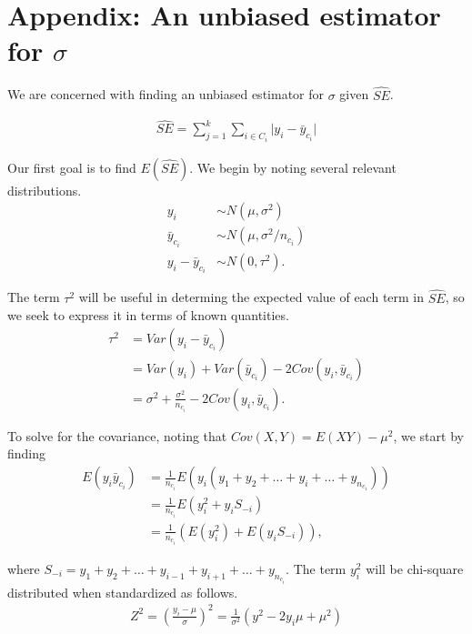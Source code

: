 \section{Appendix: An unbiased estimator for $\sigma$}
\label{Sec:AppSig}

We are concerned with finding an unbiased estimator for $\sigma$ given $\widehat{SE}$.

\begin{align}
\widehat{SE} = \sum_{j=1}^k \sum_{i \in C_i} \lvert y_i - \bar{y}_{c_i} \rvert \label{eq:se}
\end{align}

Our first goal is to find $E(\widehat{SE})$. We begin by noting several relevant distributions.
\begin{align*}
y_i &\sim N(\mu, \sigma^2) \\
\bar{y}_{c_i} &\sim N(\mu, \sigma^2/n_{c_i}) \\
y_i - \bar{y}_{c_i} &\sim N(0, \tau^2).
\end{align*}

The term $\tau^2$ will be useful in determing the expected value of each term in $\widehat{SE}$, so we seek to express it in terms of known quantities.
\begin{align}
\tau^2 &= Var(y_i - \bar{y}_{c_i}) \nonumber \\
&= Var(y_i) + Var(\bar{y}_{c_i}) - 2 Cov(y_i, \bar{y}_{c_i}) \nonumber \\
&= \sigma^2 + \frac{\sigma^2}{n_{c_i}} - 2 Cov(y_i, \bar{y}_{c_i}). \label{eq:tau}
\end{align}

To solve for the covariance, noting that $Cov(X,Y) = E(XY) - \mu^2$, we start by finding
\begin{align}
E(y_i \bar{y}_{c_i}) &= \frac{1}{n_{c_i}} E(y_i (y_1 + y_2 + \ldots + y_i + \ldots + y_{n_{c_1}})) \nonumber \\
&= \frac{1}{n_{c_i}} E(y_i^2 + y_i S_{-i}) \nonumber \\
&= \frac{1}{n_{c_i}}\left( E\left(y_i^2\right) + E\left(y_i S_{-i}\right)\right), \label{eq:eyy}
\end{align}

where $S_{-i} = y_1 + y_2 + \ldots + y_{i-1} + y_{i+1} + \ldots + y_{n_{c_i}}$. The term $y_i^2$ will be chi-square distributed when standardized as follows.
\begin{align*}
Z^2 = \left(\frac{y_i - \mu}{\sigma}\right)^2 = \frac{1}{\sigma^2}\left(y^2 - 2y_i\mu + \mu^2\right)
\end{align*}

